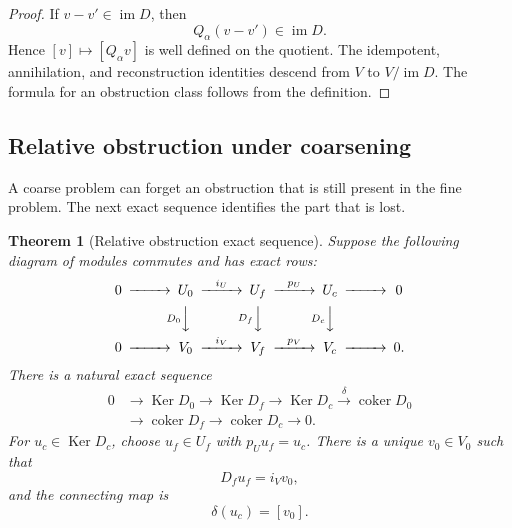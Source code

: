 \documentclass[11pt,a4paper]{article}
\newtheorem{theorem}{Theorem}[section]
\theoremstyle{plain}
\theoremstyle{definition}
\theoremstyle{remark}
\newcommand{\im}{\operatorname{im}}
\newcommand{\Ker}{\operatorname{Ker}}
\newcommand{\coker}{\operatorname{coker}}
\begin{document}
\begin{proof}
If $v-v'\in\im D$, then
\[
Q_\alpha(v-v')\in\im D.
\]
Hence $[v]\mapsto[Q_\alpha v]$ is well defined on the quotient.  The idempotent, annihilation, and reconstruction identities descend from $V$ to $V/\im D$.  The formula for an obstruction class follows from the definition.
\end{proof}

\subsection{Relative obstruction under coarsening}

A coarse problem can forget an obstruction that is still present in the fine problem.  The next exact sequence identifies the part that is lost.

\begin{theorem}[Relative obstruction exact sequence]\label{thm:relative_obstruction_sequence}
Suppose the following diagram of modules commutes and has exact rows:
\[
\begin{CD}
0 @>>> U_0 @>{i_U}>> U_f @>{p_U}>> U_c @>>> 0\\
@. @V{D_0}VV @V{D_f}VV @V{D_c}VV @.\\
0 @>>> V_0 @>{i_V}>> V_f @>{p_V}>> V_c @>>> 0.
\end{CD}
\]
There is a natural exact sequence
\[
\begin{aligned}
0&\longrightarrow\Ker D_0
\longrightarrow\Ker D_f
\longrightarrow\Ker D_c
\xrightarrow{\delta}\coker D_0\\
&\longrightarrow\coker D_f
\longrightarrow\coker D_c
\longrightarrow0.
\end{aligned}
\]
For $u_c\in\Ker D_c$, choose $u_f\in U_f$ with $p_Uu_f=u_c$.  There is a unique $v_0\in V_0$ such that
\[
D_fu_f=i_Vv_0,
\]
and the connecting map is
\[
\delta(u_c)=[v_0].
\]
\end{theorem}
\end{document}
